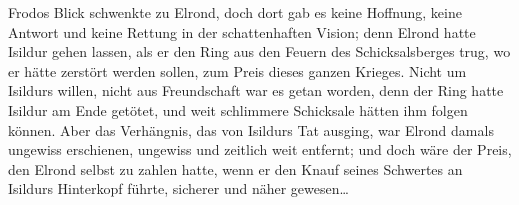 Frodos Blick schwenkte zu Elrond, doch dort gab es keine Hoffnung, keine Antwort und keine Rettung in der schattenhaften Vision; denn Elrond hatte Isildur gehen lassen, als er den Ring aus den Feuern des Schicksalsberges trug, wo er hätte zerstört werden sollen, zum Preis dieses ganzen Krieges. Nicht um Isildurs willen, nicht aus Freundschaft war es getan worden, denn der Ring hatte Isildur am Ende getötet, und weit schlimmere Schicksale hätten ihm folgen können. Aber das Verhängnis, das von Isildurs Tat ausging, war Elrond damals ungewiss erschienen, ungewiss und zeitlich weit entfernt; und doch wäre der Preis, den Elrond selbst zu zahlen hatte, wenn er den Knauf seines Schwertes an Isildurs Hinterkopf führte, sicherer und näher gewesen…

